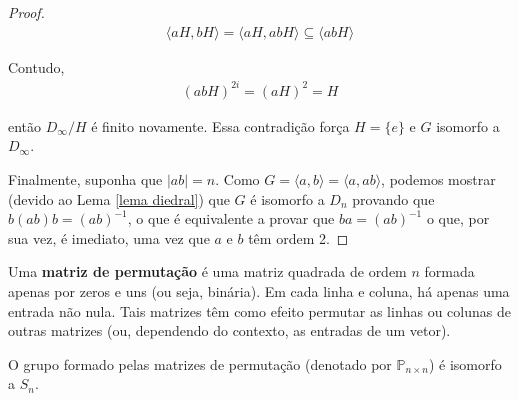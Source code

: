 \begin{proof}
		\begin{align*}
		\langle aH, bH \rangle = \langle aH, abH \rangle\subseteq \langle abH \rangle
		\end{align*}
		\par\vspace{0.3cm} Contudo, 
		\begin{align*}
		(abH)^{2i} = (aH)^2 = H
		\end{align*}
		\par\vspace{0.3cm} então $D_{\infty}/H$ é finito novamente. Essa contradição força $H = \{e\}$ e $G$ isomorfo a $D_{\infty}$.
		\par\vspace{0.3cm} Finalmente, suponha que $|ab| = n$. Como $G = \langle a,b \rangle = \langle a,ab \rangle$, podemos mostrar (devido ao Lema \eqref{lema diedral}) que $G$ é isomorfo a $D_n$ provando que $b(ab)b = (ab)^{-1}$, o que é equivalente a provar que $ba = (ab)^{-1}$ o que, por sua vez, é imediato, uma vez que $a$ e $b$ têm ordem 2.
		
	\end{proof}
	
	\par\vspace{0.3cm}
	
	\begin{deff}
		Uma \textbf{matriz de permutação} é uma matriz quadrada de ordem $n$ formada apenas por zeros e uns (ou seja, binária). Em cada linha e coluna, há apenas uma entrada não nula. Tais matrizes têm como efeito permutar as linhas ou colunas de outras matrizes (ou, dependendo do contexto, as entradas de um vetor).
	\end{deff}
	
	\par\vspace{0.3cm}
	
	\begin{lemma}
		\label{matrizes de permutacao}
		O grupo formado pelas matrizes de permutação (denotado por $\mathbb{P}_{n\times n}$) é isomorfo a $S_n$.
	\end{lemma}
	
